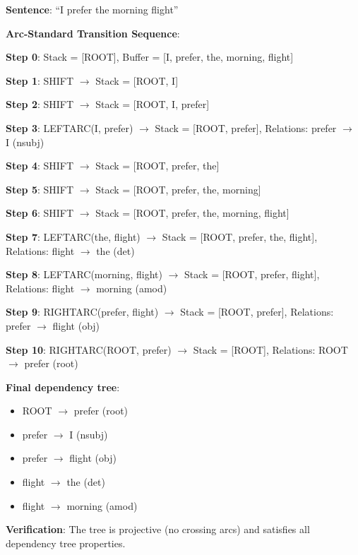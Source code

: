 \documentclass[11pt,a4paper]{article}
\begin{document}
\begin{tcolorbox}[colback=green!5!white,colframe=green!75!black,title=\textbf{Worked Example 26: Shift-Reduce Parsing with LEFTARC/RIGHTARC}]
\textbf{Sentence}: ``I prefer the morning flight''

\textbf{Arc-Standard Transition Sequence}:

\textbf{Step 0}: Stack = [ROOT], Buffer = [I, prefer, the, morning, flight]

\textbf{Step 1}: SHIFT $\to$ Stack = [ROOT, I]

\textbf{Step 2}: SHIFT $\to$ Stack = [ROOT, I, prefer]

\textbf{Step 3}: LEFTARC(I, prefer) $\to$ Stack = [ROOT, prefer], Relations: prefer $\to$ I (nsubj)

\textbf{Step 4}: SHIFT $\to$ Stack = [ROOT, prefer, the]

\textbf{Step 5}: SHIFT $\to$ Stack = [ROOT, prefer, the, morning]

\textbf{Step 6}: SHIFT $\to$ Stack = [ROOT, prefer, the, morning, flight]

\textbf{Step 7}: LEFTARC(the, flight) $\to$ Stack = [ROOT, prefer, the, flight], Relations: flight $\to$ the (det)

\textbf{Step 8}: LEFTARC(morning, flight) $\to$ Stack = [ROOT, prefer, flight], Relations: flight $\to$ morning (amod)

\textbf{Step 9}: RIGHTARC(prefer, flight) $\to$ Stack = [ROOT, prefer], Relations: prefer $\to$ flight (obj)

\textbf{Step 10}: RIGHTARC(ROOT, prefer) $\to$ Stack = [ROOT], Relations: ROOT $\to$ prefer (root)

\textbf{Final dependency tree}:
\begin{itemize}
    \item ROOT $\to$ prefer (root)
    \item prefer $\to$ I (nsubj)
    \item prefer $\to$ flight (obj)
    \item flight $\to$ the (det)
    \item flight $\to$ morning (amod)
\end{itemize}

\textbf{Verification}: The tree is projective (no crossing arcs) and satisfies all dependency tree properties.
\end{tcolorbox}
\end{document}
